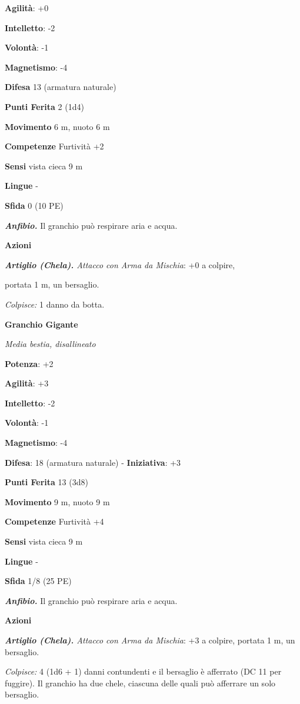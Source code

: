 \begin{multicols}{2}
\textbf{Agilità}: +0

\textbf{Intelletto}: -2

\textbf{Volontà}: -1

\textbf{Magnetismo}: -4

\textbf{Difesa} 13 (armatura naturale)

\textbf{Punti Ferita} 2 (1d4)

\textbf{Movimento} 6 m, nuoto 6 m

\textbf{Competenze} Furtività +2

\textbf{Sensi} vista cieca 9 m

\textbf{Lingue} -

\textbf{Sfida} 0 (10 PE)\smallskip

\emph{\textbf{Anfibio.}} Il granchio può respirare aria e acqua.

\smallskip\textbf{Azioni}

\emph{\textbf{Artiglio (Chela).} Attacco con Arma da Mischia}: +0 a
colpire,

portata 1 m, un bersaglio.

\emph{Colpisce:} 1 danno da botta.

\textbf{Granchio Gigante}

\emph{Media bestia, disallineato}

\textbf{Potenza}: +2

\textbf{Agilità}: +3

\textbf{Intelletto}: -2

\textbf{Volontà}: -1

\textbf{Magnetismo}: -4

\textbf{Difesa}: 18 (armatura naturale) - \textbf{Iniziativa}: +3

\textbf{Punti Ferita} 13 (3d8)

\textbf{Movimento} 9 m, nuoto 9 m

\textbf{Competenze} Furtività +4

\textbf{Sensi} vista cieca 9 m

\textbf{Lingue} -

\textbf{Sfida} 1/8 (25 PE)\smallskip

\emph{\textbf{Anfibio.}} Il granchio può respirare aria e acqua.

\smallskip\textbf{Azioni}

\emph{\textbf{Artiglio (Chela).} Attacco con Arma da Mischia}: +3 a
colpire, portata 1 m, un bersaglio.

\emph{Colpisce:} 4 (1d6 + 1) danni contundenti e il bersaglio è
afferrato (DC 11 per fuggire). Il granchio ha due chele, ciascuna delle
quali può afferrare un solo bersaglio.


\end{multicols}
